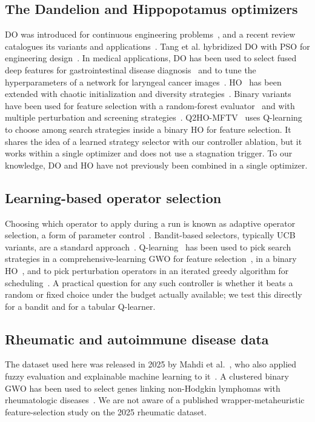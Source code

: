 \documentclass[journal]{IEEEtran}
\begin{document}
\subsection{The Dandelion and Hippopotamus optimizers}
DO was introduced for continuous engineering problems~\cite{zhao2022do}, and a recent review catalogues its variants and applications~\cite{zhao2026review}. Tang et al. hybridized DO with PSO for engineering design~\cite{tang2024psodo}. In medical applications, DO has been used to select fused deep features for gastrointestinal disease diagnosis~\cite{kiziloluk2024} and to tune the hyperparameters of a network for laryngeal cancer images~\cite{alzakari2024}. HO~\cite{amiri2024ho} has been extended with chaotic initialization and diversity strategies~\cite{pei2025}. Binary variants have been used for feature selection with a random-forest evaluator~\cite{ardiyansa2025} and with multiple perturbation and screening strategies~\cite{yuan2025msho}. Q2HO-MFTV~\cite{hashjin2025q2ho} uses Q-learning to choose among search strategies inside a binary HO for feature selection. It shares the idea of a learned strategy selector with our controller ablation, but it works within a single optimizer and does not use a stagnation trigger. To our knowledge, DO and HO have not previously been combined in a single optimizer.

\subsection{Learning-based operator selection}
Choosing which operator to apply during a run is known as adaptive operator selection, a form of parameter control~\cite{karafotias2015}. Bandit-based selectors, typically UCB variants, are a standard approach~\cite{fialho2010}. Q-learning~\cite{watkins1992} has been used to pick search strategies in a comprehensive-learning GWO for feature selection~\cite{hu2023rlgwo}, in a binary HO~\cite{hashjin2025q2ho}, and to pick perturbation operators in an iterated greedy algorithm for scheduling~\cite{karimi2023}. A practical question for any such controller is whether it beats a random or fixed choice under the budget actually available; we test this directly for a bandit and for a tabular Q-learner.

\subsection{Rheumatic and autoimmune disease data}
The dataset used here was released in 2025 by Mahdi et al.~\cite{mahdi2025data}, who also applied fuzzy evaluation and explainable machine learning to it~\cite{mahdi2025fuzzy}. A clustered binary GWO has been used to select genes linking non-Hodgkin lymphomas with rheumatologic diseases~\cite{karadayi2025}. We are not aware of a published wrapper-metaheuristic feature-selection study on the 2025 rheumatic dataset.
\end{document}
